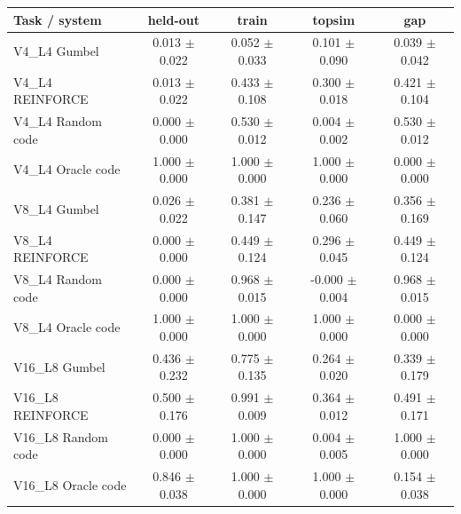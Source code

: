 \begin{tabular}{lcccc}
\toprule
Task / system & held-out & train & topsim & gap \\
\midrule
V4\_L4 Gumbel & 0.013 $\pm$ 0.022 & 0.052 $\pm$ 0.033 & 0.101 $\pm$ 0.090 & 0.039 $\pm$ 0.042 \\
V4\_L4 REINFORCE & 0.013 $\pm$ 0.022 & 0.433 $\pm$ 0.108 & 0.300 $\pm$ 0.018 & 0.421 $\pm$ 0.104 \\
V4\_L4 Random code & 0.000 $\pm$ 0.000 & 0.530 $\pm$ 0.012 & 0.004 $\pm$ 0.002 & 0.530 $\pm$ 0.012 \\
V4\_L4 Oracle code & 1.000 $\pm$ 0.000 & 1.000 $\pm$ 0.000 & 1.000 $\pm$ 0.000 & 0.000 $\pm$ 0.000 \\
V8\_L4 Gumbel & 0.026 $\pm$ 0.022 & 0.381 $\pm$ 0.147 & 0.236 $\pm$ 0.060 & 0.356 $\pm$ 0.169 \\
V8\_L4 REINFORCE & 0.000 $\pm$ 0.000 & 0.449 $\pm$ 0.124 & 0.296 $\pm$ 0.045 & 0.449 $\pm$ 0.124 \\
V8\_L4 Random code & 0.000 $\pm$ 0.000 & 0.968 $\pm$ 0.015 & -0.000 $\pm$ 0.004 & 0.968 $\pm$ 0.015 \\
V8\_L4 Oracle code & 1.000 $\pm$ 0.000 & 1.000 $\pm$ 0.000 & 1.000 $\pm$ 0.000 & 0.000 $\pm$ 0.000 \\
V16\_L8 Gumbel & 0.436 $\pm$ 0.232 & 0.775 $\pm$ 0.135 & 0.264 $\pm$ 0.020 & 0.339 $\pm$ 0.179 \\
V16\_L8 REINFORCE & 0.500 $\pm$ 0.176 & 0.991 $\pm$ 0.009 & 0.364 $\pm$ 0.012 & 0.491 $\pm$ 0.171 \\
V16\_L8 Random code & 0.000 $\pm$ 0.000 & 1.000 $\pm$ 0.000 & 0.004 $\pm$ 0.005 & 1.000 $\pm$ 0.000 \\
V16\_L8 Oracle code & 0.846 $\pm$ 0.038 & 1.000 $\pm$ 0.000 & 1.000 $\pm$ 0.000 & 0.154 $\pm$ 0.038 \\
\bottomrule
\end{tabular}
